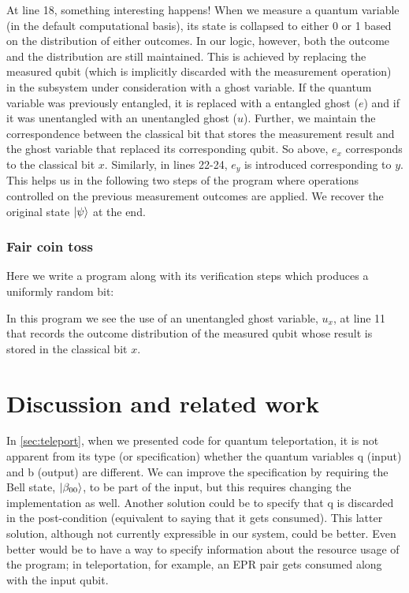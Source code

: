 \documentclass[adraft,creativecommons]{eptcs}
\begin{document}


At line 18, something interesting happens! When we measure a quantum variable (in the default computational basis), its state is collapsed to either 0 or 1 based on the distribution of either outcomes. In our logic, however, both the outcome and the distribution are still maintained. This is achieved by replacing the measured qubit (which is implicitly discarded with the measurement operation) in the subsystem under consideration with a ghost variable. If the quantum variable was previously entangled, it is replaced with a entangled ghost ($e$) and if it was unentangled with an unentangled ghost ($u$). Further, we maintain the correspondence between the classical bit that stores the measurement result and the ghost variable that replaced its corresponding qubit. So above, $e_x$ corresponds to the classical bit $x$. Similarly, in lines 22-24, $e_y$ is introduced corresponding to $y$. This helps us in the following two steps of the program where operations controlled on the previous measurement outcomes are applied. We recover the original state $\ket{\psi}$ at the end.

\subsubsection{Fair coin toss}

Here we write a program along with its verification steps which produces a uniformly random bit:



In this program we see the use of an unentangled ghost variable, $u_x$, at line 11 that records the outcome distribution of the measured qubit whose result is stored in the classical bit $x$.

\section{Discussion and related work}

In \cref{sec:teleport}, when we presented code for quantum teleportation, it is not apparent from its type (or specification) whether the quantum variables q (input) and b (output) are different. We can improve the specification by requiring the Bell state, $\ket{\beta_{00}}$, to be part of the input, but this requires changing the implementation as well. Another solution could be to specify that q is discarded in the post-condition (equivalent to saying that it gets consumed). This latter solution, although not currently expressible in our system, could be better. Even better would be to have a way to specify information about the resource usage of the program; in teleportation, for example, an EPR pair gets consumed along with the input qubit.
\end{document}
